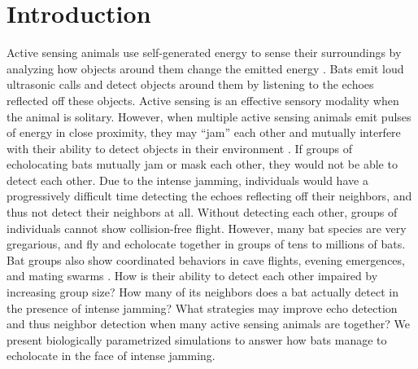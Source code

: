 \documentclass[
]{book}
\begin{document}
\newpage

\hypertarget{introduction}{%
\section{Introduction}\label{introduction}}

Active sensing animals use self-generated energy to sense their surroundings by analyzing how objects around them change the emitted energy \citep{nelson2006a}. Bats emit loud ultrasonic calls and detect objects around them by listening to the echoes \citep[\citet{griffin1958a}]{fenton2013a}reflected off these objects. Active sensing is an effective sensory modality when the animal is solitary. However, when multiple active sensing animals emit pulses of energy in close proximity, they may ``jam'' each other and mutually interfere with their ability to detect objects in their environment \citep[\citet{matsubara1978a}]{nelson2006a}. If groups of echolocating bats mutually jam or mask each other, they would not be able to detect each other. Due to the intense jamming, individuals would have a progressively difficult time detecting the echoes reflecting off their neighbors, and thus not detect their neighbors at all. Without detecting each other, groups of individuals cannot show collision-free flight. However, many bat species are very gregarious, and fly and echolocate together in groups of tens to millions of bats. Bat groups also show coordinated behaviors in cave flights, evening emergences, and mating swarms \citep[\citet{kunz1982a}]{ortega2016a}. How is their ability to detect each other impaired by increasing group size? How many of its neighbors does a bat actually detect in the presence of intense jamming? What strategies may improve echo detection and thus neighbor detection when many active sensing animals are together? We present biologically parametrized simulations to answer how bats manage to echolocate in the face of intense jamming.
\end{document}
